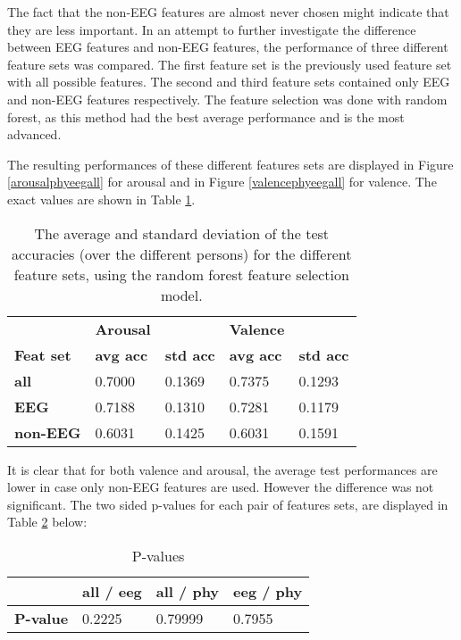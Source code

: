 The fact that the non-EEG features are almost never chosen might indicate that they are less important. In an attempt to further investigate the difference between EEG features and non-EEG features, the performance of three different feature sets was compared. The first feature set is the previously used feature set with all possible features. The second and third feature sets contained only EEG and non-EEG features respectively. The feature selection was done with random forest, as this method had the best average performance and is the most advanced. 

\npar

The resulting performances of these different features sets are displayed in Figure \ref{arousalphyeegall} for arousal and in Figure \ref{valencephyeegall} for valence. The exact values are shown in Table \ref{phyeegalltable}.



\begin{table}[H]
\centering
\begin{tabular}{l|ll|ll}
         & \textbf{Arousal} &         & \textbf{Valence} &         \\
\textbf{Feat set} & \textbf{avg acc} & \textbf{std acc} & \textbf{avg acc} & \textbf{std acc} \\ \hline 
\textbf{all}      & 0.7000  & 0.1369  & 0.7375  & 0.1293  \\
\textbf{EEG}      & 0.7188  & 0.1310  & 0.7281  & 0.1179  \\
\textbf{non-EEG}  & 0.6031  & 0.1425  & 0.6031  & 0.1591 
\end{tabular}
\caption{The average and standard deviation of the test accuracies (over the different persons) for the different feature sets, using the random forest feature selection model.\label{phyeegalltable}}
\end{table}

It is clear that for both valence and arousal, the average test performances are lower in case only non-EEG features are used. However the difference was not significant. The two sided p-values for each pair of features sets, are displayed in Table \ref{pvals} below:

\begin{table}[H]
\centering
\begin{tabular}{l|lll}
	    & \textbf{all / eeg} & \textbf{all / phy} & \textbf{eeg / phy} \\ \hline
\textbf{P-value} & 0.2225             & 0.79999            & 0.7955            
\end{tabular}
\caption{P-values\label{pvals}}
\end{table}
\clearpage

